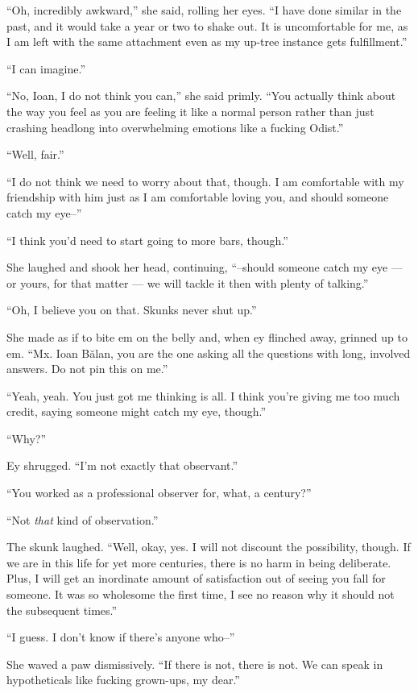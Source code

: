 ``Oh, incredibly awkward,'' she said, rolling her eyes. ``I have done similar in the past, and it would take a year or two to shake out. It is uncomfortable for me, as I am left with the same attachment even as my up-tree instance gets fulfillment.''

``I can imagine.''

``No, Ioan, I do not think you can,'' she said primly. ``You actually think about the way you feel as you are feeling it like a normal person rather than just crashing headlong into overwhelming emotions like a fucking Odist.''

``Well, fair.''

``I do not think we need to worry about that, though. I am comfortable with my friendship with him just as I am comfortable loving you, and should someone catch my eye--''

``I think you'd need to start going to more bars, though.''

She laughed and shook her head, continuing, ``--should someone catch my eye — or yours, for that matter — we will tackle it then with plenty of talking.''

``Oh, I believe you on that. Skunks never shut up.''

She made as if to bite em on the belly and, when ey flinched away, grinned up to em. ``Mx. Ioan Bălan, you are the one asking all the questions with long, involved answers. Do not pin this on me.''

``Yeah, yeah. You just got me thinking is all. I think you're giving me too much credit, saying someone might catch my eye, though.''

``Why?''

Ey shrugged. ``I'm not exactly that observant.''

``You worked as a professional observer for, what, a century?''

``Not \emph{that} kind of observation.''

The skunk laughed. ``Well, okay, yes. I will not discount the possibility, though. If we are in this life for yet more centuries, there is no harm in being deliberate. Plus, I will get an inordinate amount of satisfaction out of seeing you fall for someone. It was so wholesome the first time, I see no reason why it should not the subsequent times.''

``I guess. I don't know if there's anyone who--''

She waved a paw dismissively. ``If there is not, there is not. We can speak in hypotheticals like fucking grown-ups, my dear.''

